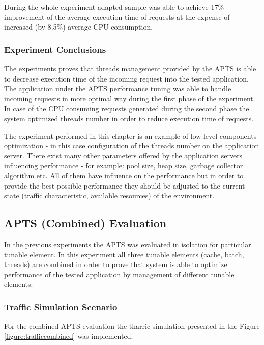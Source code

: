 \documentclass[10pt,a4paper]{article}
\begin{document}
During the whole experiment adapted sample was able to achieve 17\% improvement of the average execution time of requests at the expense of increased (by 8.5\%) average CPU consumption. 

\subsubsection{Experiment Conclusions} 

The experiments proves that threads management provided by the APTS is able to decrease execution time of the incoming request into the tested application. The application under the APTS performance tuning was able to handle incoming requests in more optimal way during the first phase of the experiment. In case of the CPU consuming requests generated during the second phase the system optimized threads number in order to reduce execution time of requests. 

The experiment performed in this chapter is an example of low level components optimization - in this case configuration of the threads number on the application server. There exist many other parameters offered by the application servers influencing performance - for example: pool size, heap size, garbage collector algorithm etc. All of them have influence on the performance but in order to provide the best possible performance they should be adjusted to the current state (traffic characteristic, available resources) of the environment. 


\subsection{APTS (Combined) Evaluation}

In the previous experiments the APTS was evaluated in isolation for particular tunable element. In this experiment all three tunable elements (cache, batch, threads) are combined in order to prove that system is able to optimize performance  of the tested application by management of different tunable elements.   

\subsubsection{Traffic Simulation Scenario} 

For the combined APTS evaluation the tharric simulation presented in the Figure \ref{figure:trafficcombined} was implemented. 
\end{document}

